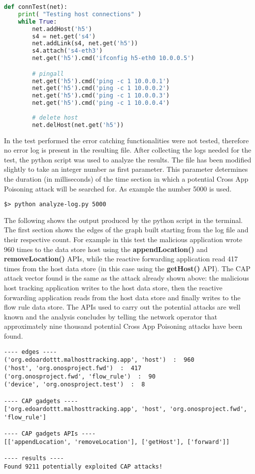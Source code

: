 \documentclass[a4paper,10pt]{memoir}
\begin{document}
\begin{lstlisting}[language=python]
def connTest(net):
    print( "Testing host connections" )
    while True:
        net.addHost('h5')
        s4 = net.get('s4')
        net.addLink(s4, net.get('h5'))
        s4.attach('s4-eth3')
        net.get('h5').cmd('ifconfig h5-eth0 10.0.0.5')

        # pingall
        net.get('h5').cmd('ping -c 1 10.0.0.1')
        net.get('h5').cmd('ping -c 1 10.0.0.2')
        net.get('h5').cmd('ping -c 1 10.0.0.3')
        net.get('h5').cmd('ping -c 1 10.0.0.4')
        
        # delete host
        net.delHost(net.get('h5'))
\end{lstlisting}
In the test performed the error catching functionalities were not tested, therefore no error log is present in the resulting file. After collecting the logs needed for the test, the python script was used to analyze the results. The file has been modified slightly to take an integer number as first parameter. This parameter determines the duration (in milliseconds) of the time section in which a potential Cross App Poisoning attack will be searched for. As example the number 5000 is used.
\begin{lstlisting}
$> python analyze-log.py 5000
\end{lstlisting}
The following shows the output produced by the python script in the terminal. The first section shows the edges of the graph built starting from the log file and their respective count. For example in this test the malicious application wrote 960 times to the data store host using the \textbf{appendLocation()} and \textbf{removeLocation()} APIs, while the reactive forwarding application read 417 times from the host data store (in this case using the \textbf{getHost()} API). The CAP attack vector found is the same as the attack already shown above: the malicious host tracking application writes to the host data store, then the reactive forwarding application reads from the host data store and finally writes to the flow rule data store. The APIs used to carry out the potential attacks are well known and the analysis concludes by telling the network operator that approximately nine thousand potential Cross App Poisoning attacks have been found. 
\begin{lstlisting}
---- edges ----
('org.edoardottt.malhosttracking.app', 'host')  :  960
('host', 'org.onosproject.fwd')  :  417
('org.onosproject.fwd', 'flow_rule')  :  90
('device', 'org.onosproject.test')  :  8

---- CAP gadgets ----
['org.edoardottt.malhosttracking.app', 'host', 'org.onosproject.fwd', 'flow_rule']

---- CAP gadgets APIs ----
[['appendLocation', 'removeLocation'], ['getHost'], ['forward']]

---- results ----
Found 9211 potentially exploited CAP attacks!
\end{lstlisting}
\end{document}
